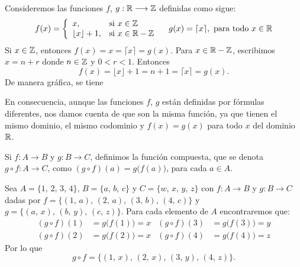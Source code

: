 \begin{myexample}
    Consideremos las funciones $f$, $g: \RR \longrightarrow \ZZ$ definidas como sigue:
    $$f(x) = \left\{ \begin{array}{ll}
        x, & \text{si } x \in \ZZ \\
        \lfloor x \rfloor + 1, & \text{si } x \in \RR - \ZZ
    \end{array}\right. \quad g(x) = \lceil x \rceil, \text{ para todo $x \in \RR$}$$
    Si $x \in \ZZ$, entonces $f(x) = x = \lceil x \rceil = g(x)$. Para $x \in \RR - \ZZ$, escribimos $x = n + r$ donde $n \in \ZZ$ y $0 < r < 1$. Entonces
    $$f(x) = \lfloor x \rfloor + 1 = n + 1 = \lceil x \rceil = g(x).$$
    De manera gráfica, se tiene
    \begin{center}
    \end{center}
    En consecuencia, aunque las funciones $f$, $g$ están definidas por fórmulas diferentes, nos damos cuenta de que son la misma función, ya que tienen el mismo dominio, el mismo codominio y $f(x) = g(x)$ para todo $x$ del dominio $\RR$.
\end{myexample}

\begin{definicion}{}{}
    Si $f:A \longrightarrow B$ y $g:B \longrightarrow C$, definimos la función compuesta, que se denota $g \circ f:A \longrightarrow C$, como $(g \circ f)(a) = g \big( f(a) \big)$, para cada $a \in A$.
\end{definicion}

\begin{myexample}
    Sea $A = \{ 1, \, 2, \, 3, \, 4 \}$, $B = \{ a, \, b, \, c \}$ y $C = \{ w, \, x, \, y, \, z \}$ con $f: A \longrightarrow B$ y $g: B \longrightarrow C$ dadas por $f = \{ (1, \, a), \, (2, \, a), \, (3, \, b), \, (4, \, c) \}$ y $g = \{ (a, \, x), \, (b, \, y), \, (c, \, z) \}$. Para cada elemento de $A$ encontraremos que:
    \begin{align*}
        (g \circ f)(1) & = g\big( f(1) \big) = x & (g \circ f)(3) & = g\big( f(3) \big) = y \\
        (g \circ f)(2) & = g\big( f(2) \big) = x & (g \circ f)(4) & = g\big( f(4) \big) = z
    \end{align*}
    Por lo que
    $$g \circ f = \{(1, \, x), \, (2, \, x), \, (3, \, y), \, (4, \, z) \}.$$
\end{myexample}

